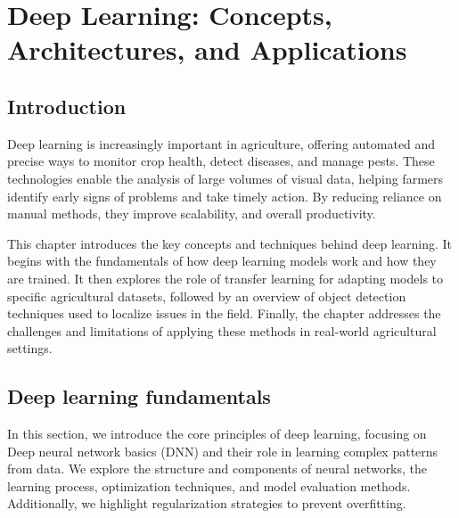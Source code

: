 \chapter{Deep Learning: Concepts, Architectures, and Applications}

\section{Introduction}
Deep learning is increasingly important in agriculture, offering automated and precise ways to monitor crop health, detect diseases, and manage pests. These technologies enable the analysis of large volumes of visual data, helping farmers identify early signs of problems and take timely action. By reducing reliance on manual methods, they improve scalability, and overall productivity.

This chapter introduces the key concepts and techniques behind deep learning. It begins with the fundamentals of how deep learning models work and how they are trained. It then explores the role of transfer learning for adapting models to specific agricultural datasets, followed by an overview of object detection techniques used to localize issues in the field. Finally, the chapter addresses the challenges and limitations of applying these methods in real-world agricultural settings.

\section{Deep learning fundamentals}
In this section, we introduce the core principles of deep learning, focusing on Deep neural network basics (DNN) and their role in learning complex patterns from data. We explore the structure and components of neural networks, the learning process, optimization techniques, and model evaluation methods. Additionally, we highlight regularization strategies to prevent overfitting.

